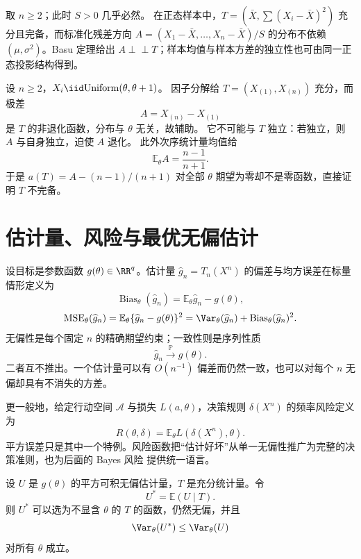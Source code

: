 \begin{workedexample}[标准化正态残差的独立性]
取 $n\ge2$；此时 $S>0$ 几乎必然。
在正态样本中，$T=(\bar X,\sum(X_i-\bar X)^2)$ 充分且完备，而标准化残差方向 $A=(X_1-\bar X,\ldots,X_n-\bar X)/S$ 的分布不依赖 $(\mu,\sigma^2)$。Basu 定理给出 $A\perp\!\!\!\perp T$；样本均值与样本方差的独立性也可由同一正态投影结构得到。
\end{workedexample}


\begin{workedexample}[充分性不能代替完备性]
设 $n\ge2$，$X_i\iid\mathrm{Uniform}(\theta,\theta+1)$。
因子分解给 $T=(X_{(1)},X_{(n)})$ 充分，而极差
\[
 A=X_{(n)}-X_{(1)}
\]
是 $T$ 的非退化函数，分布与 $\theta$ 无关，故辅助。
它不可能与 $T$ 独立：若独立，则 $A$ 与自身独立，迫使 $A$ 退化。
此外次序统计量均值给
\[
 \mathbb E_\theta A=\frac{n-1}{n+1}.
\]
于是 $a(T)=A-(n-1)/(n+1)$ 对全部 $\theta$ 期望为零却不是零函数，直接证明 $T$ 不完备。
\end{workedexample}

\section{估计量、风险与最优无偏估计}

\begin{definition}
设目标是参数函数 $g(\theta)\in\RR^q$。估计量 $\widehat g_n=T_n(X^n)$ 的偏差与均方误差在标量情形定义为
\[
 \operatorname{Bias}_\theta(\widehat g_n)
 =\mathbb E_\theta\widehat g_n-g(\theta),
\]
\[
 \operatorname{MSE}_\theta(\widehat g_n)
 =\mathbb E_\theta\{\widehat g_n-g(\theta)\}^2
 =\Var_\theta(\widehat g_n)+\operatorname{Bias}_\theta(\widehat g_n)^2.
\]
无偏性是每个固定 $n$ 的精确期望约束；一致性则是序列性质
\[
 \widehat g_n\xrightarrow{\mathbb P} g(\theta).
\]
二者互不推出。一个估计量可以有 $O(n^{-1})$ 偏差而仍然一致，也可以对每个 $n$ 无偏却具有不消失的方差。
\end{definition}

\begin{definition}[损失与频率风险]
更一般地，给定行动空间 $\mathcal A$ 与损失 $L(a,\theta)$，决策规则 $\delta(X^n)$ 的频率风险定义为
\[
 R(\theta,\delta)
 =\mathbb E_\theta L(\delta(X^n),\theta).
\]
平方误差只是其中一个特例。风险函数把“估计好坏”从单一无偏性推广为完整的决策准则，也为后面的 Bayes 风险 提供统一语言。
\end{definition}

\begin{theorem}
设 $U$ 是 $g(\theta)$ 的平方可积无偏估计量，$T$ 是充分统计量。令
\[
 U^*=\mathbb E(U\mid T).
\]
则 $U^*$ 可以选为不显含 $\theta$ 的 $T$ 的函数，仍然无偏，并且
\[
 \Var_\theta(U^*)\le\Var_\theta(U)
\]
对所有 $\theta$ 成立。
\end{theorem}

